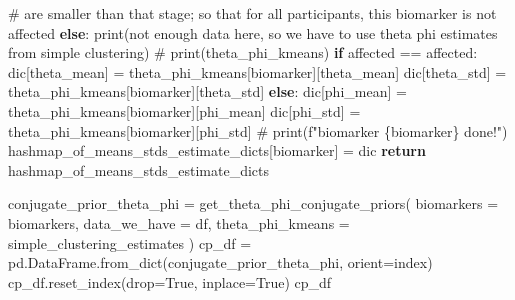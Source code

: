 \documentclass[
  letterpaper,
  DIV=11,
  numbers=noendperiod]{scrreprt}
\newenvironment{Shaded}{\begin{snugshade}}{\end{snugshade}}
\newcommand{\BuiltInTok}[1]{\textcolor[rgb]{0.00,0.23,0.31}{#1}}
\newcommand{\CommentTok}[1]{\textcolor[rgb]{0.37,0.37,0.37}{#1}}
\newcommand{\ControlFlowTok}[1]{\textcolor[rgb]{0.00,0.23,0.31}{\textbf{#1}}}
\newcommand{\NormalTok}[1]{\textcolor[rgb]{0.00,0.23,0.31}{#1}}
\newcommand{\OperatorTok}[1]{\textcolor[rgb]{0.37,0.37,0.37}{#1}}
\newcommand{\StringTok}[1]{\textcolor[rgb]{0.13,0.47,0.30}{#1}}
\newcommand{\VariableTok}[1]{\textcolor[rgb]{0.07,0.07,0.07}{#1}}
\begin{document}
\begin{Shaded}
\begin{Highlighting}[]
            \CommentTok{\# are smaller than that stage; so that for all participants, this biomarker is not affected}
            \ControlFlowTok{else}\NormalTok{:}
                \BuiltInTok{print}\NormalTok{(}\StringTok{\textquotesingle{}not enough data here, so we have to use theta phi estimates from simple clustering\textquotesingle{}}\NormalTok{)}
                \CommentTok{\# print(theta\_phi\_kmeans)}
                \ControlFlowTok{if}\NormalTok{ affected }\OperatorTok{==} \StringTok{\textquotesingle{}affected\textquotesingle{}}\NormalTok{:}
\NormalTok{                    dic[}\StringTok{\textquotesingle{}theta\_mean\textquotesingle{}}\NormalTok{] }\OperatorTok{=}\NormalTok{ theta\_phi\_kmeans[biomarker][}\StringTok{\textquotesingle{}theta\_mean\textquotesingle{}}\NormalTok{]}
\NormalTok{                    dic[}\StringTok{\textquotesingle{}theta\_std\textquotesingle{}}\NormalTok{] }\OperatorTok{=}\NormalTok{ theta\_phi\_kmeans[biomarker][}\StringTok{\textquotesingle{}theta\_std\textquotesingle{}}\NormalTok{]}
                \ControlFlowTok{else}\NormalTok{:}
\NormalTok{                    dic[}\StringTok{\textquotesingle{}phi\_mean\textquotesingle{}}\NormalTok{] }\OperatorTok{=}\NormalTok{ theta\_phi\_kmeans[biomarker][}\StringTok{\textquotesingle{}phi\_mean\textquotesingle{}}\NormalTok{]}
\NormalTok{                    dic[}\StringTok{\textquotesingle{}phi\_std\textquotesingle{}}\NormalTok{] }\OperatorTok{=}\NormalTok{ theta\_phi\_kmeans[biomarker][}\StringTok{\textquotesingle{}phi\_std\textquotesingle{}}\NormalTok{]}
        \CommentTok{\# print(f"biomarker \{biomarker\} done!")}
\NormalTok{        hashmap\_of\_means\_stds\_estimate\_dicts[biomarker] }\OperatorTok{=}\NormalTok{ dic}
    \ControlFlowTok{return}\NormalTok{ hashmap\_of\_means\_stds\_estimate\_dicts}
\end{Highlighting}
\end{Shaded}

\begin{Shaded}
\begin{Highlighting}[]
\NormalTok{conjugate\_prior\_theta\_phi }\OperatorTok{=}\NormalTok{ get\_theta\_phi\_conjugate\_priors(}
\NormalTok{    biomarkers }\OperatorTok{=}\NormalTok{ biomarkers, }
\NormalTok{    data\_we\_have }\OperatorTok{=}\NormalTok{ df, }
\NormalTok{    theta\_phi\_kmeans }\OperatorTok{=}\NormalTok{ simple\_clustering\_estimates}
\NormalTok{)}
\NormalTok{cp\_df }\OperatorTok{=}\NormalTok{ pd.DataFrame.from\_dict(conjugate\_prior\_theta\_phi, orient}\OperatorTok{=}\StringTok{\textquotesingle{}index\textquotesingle{}}\NormalTok{)}
\NormalTok{cp\_df.reset\_index(drop}\OperatorTok{=}\VariableTok{True}\NormalTok{, inplace}\OperatorTok{=}\VariableTok{True}\NormalTok{)}
\NormalTok{cp\_df}
\end{Highlighting}
\end{Shaded}
\end{document}
